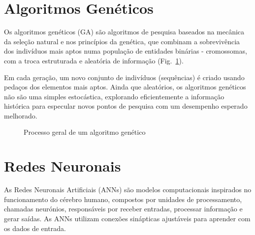 \documentclass[a4paper, portuguese]{report}
\begin{document}
\section{Algoritmos Genéticos}\label{sec:gen_algs}

Os algoritmos genéticos (GA) são algoritmos de pesquisa baseados na mecânica da seleção natural e nos princípios da genética, que combinam a sobrevivência dos indivíduos mais aptos numa população de entidades binárias - cromossomas, com a troca estruturada e aleatória de informação (Fig.~\ref{fig:ea_flowchart}). 

Em cada geração, um novo conjunto de indivíduos (sequências) é criado usando pedaços dos elementos mais aptos. Ainda que aleatórios, os  algoritmos genéticos não são uma simples  estocástica, explorando eficientemente a informação histórica para especular novos pontos de pesquisa com um desempenho esperado melhorado. \cite{Goldberg1989GeneticLearning}

\begin{figure}[htbp]
\centering
{}
\caption{Processo geral de um algoritmo genético}
\label{fig:ea_flowchart}
\end{figure}

\section{Redes Neuronais}\label{sec:neural_nets}

As Redes Neuronais Artificiais (ANNs) são modelos computacionais inspirados no funcionamento do cérebro humano, compostos por unidades de processamento, chamadas neurónios, responsáveis por receber entradas, processar informação e gerar saídas. As ANNs utilizam conexões sinápticas ajustáveis para aprender com os dados de entrada. \cite{Lippmann1988AnNets}
\end{document}
